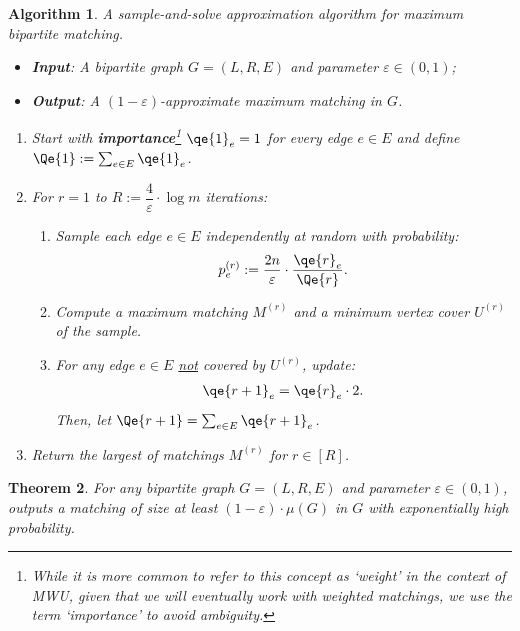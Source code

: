 \documentclass{article}
\newtheorem{theorem}{Theorem}\newtheorem{lemma}[theorem]{Lemma}\newtheorem{proposition}[theorem]{Proposition}\newtheorem{corollary}[theorem]{Corollary}\newtheorem{definition}[theorem]{Definition}\newtheorem{claim}[theorem]{Claim}\newtheorem{remark}[theorem]{Remark}\newtheorem{observation}[theorem]{Observation}\newtheorem{conjecture}[theorem]{Conjecture}\newtheorem{example}[theorem]{Example}
\newtheorem{Algorithm}[theorem]{Algorithm}
\newcommand{\eps}{\varepsilon}
\begin{document}
\begin{Algorithm}\label{alg:bipartite}
A sample-and-solve approximation algorithm for maximum bipartite matching. 

\begin{itemize}
	\item \textbf{Input}: A bipartite graph $G=(L,R,E)$ and parameter $\eps \in (0,1)$; 
	\item \textbf{Output}: A $(1-\eps)$-approximate maximum matching in $G$. 
\end{itemize}
	\begin{enumerate}
	\item Start with \textbf{importance}\footnote{While it is more common to refer to this concept as `weight' in the context of MWU, given that we will eventually work with weighted matchings, we use
	the term `importance' to avoid ambiguity.} $\qe{1}_e = 1$ for every edge $e \in E$ and define $\Qe{1} := \sum_{e \in E} \qe{1}_e$. 

	\item For $r=1$ to $R := \dfrac{4}{\eps} \cdot \log{m}$ iterations: 
	\begin{enumerate}[leftmargin=5pt]
	\item Sample each edge $e \in E$ independently at random with probability:
	\begin{align}
		p^{(r)}_e := {\frac{2n}{\eps} \cdot \frac{\qe{r}_e}{\Qe{r}}}. \label{eq:pe-bipartite}
	\end{align}
	\item\label{line:2} Compute a maximum matching $M^{(r)}$ and a minimum vertex cover $U^{(r)}$ of the sample. 
	\item For any edge $e \in E$ \underline{not} covered by $U^{(r)}$, update: 
	\begin{align}
		\qe{r+1}_e = \qe{r}_e \cdot 2. \label{eq:qe-bipartite}
	\end{align}
	Then, let $\Qe{r+1} = \sum_{e \in E} \qe{r+1}_e$. 
	\end{enumerate}
	\item Return the largest of matchings $M^{(r)}$ for $r \in [R]$. 

	\end{enumerate}
\end{Algorithm}

\begin{theorem}\label{thm:alg-bipartite}
	For any bipartite graph $G=(L,R,E)$ and parameter $\eps \in (0,1)$,  outputs a matching of size at least $(1-\eps) \cdot \mu(G)$ in $G$ with exponentially high probability. 
\end{theorem}
\end{document}
